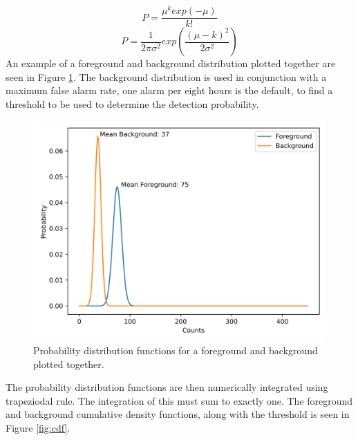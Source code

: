 	\begin{equation}
		P=\frac{\mu^kexp\left(-\mu\right)}{k!}
		\label{eq:poisson}
	\end{equation}
	\begin{equation}
		P=\frac{1}{2\pi\sigma^2}exp\left(\frac{\left(\mu-k\right)^2}{2\sigma^2}\right)
		\label{eq:gaussian}
		\end{equation}
	An example of a foreground and background distribution plotted together are seen in Figure \ref{fig:pdf}. The background distribution is used in conjunction with a maximum false alarm rate, one alarm per eight hours is the default, to find a threshold to be used to determine the detection probability. 
	
	\begin{figure}[h!]
		\centering
		\includegraphics[width=\linewidth]{pdf.png}
		\caption{Probability distribution functions for a foreground and background plotted together.}
		\label{fig:pdf}
	\end{figure}
	The probability distribution functions are then numerically integrated using trapeziodal rule. The integration of this must sum to exactly one. The foreground and background cumulative density functions, along with the threshold is seen in Figure \ref{fig:cdf}.
